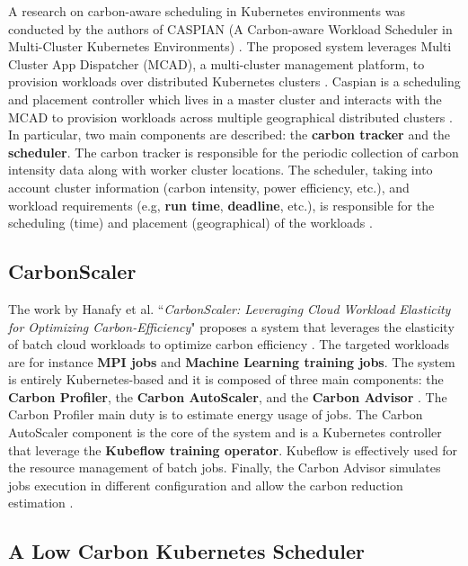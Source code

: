 A research on carbon-aware scheduling in Kubernetes environments was conducted by the authors of CASPIAN (A Carbon-aware Workload Scheduler in Multi-Cluster Kubernetes Environments) \cite{10786568}.
The proposed system leverages Multi Cluster App Dispatcher (MCAD), a multi-cluster management platform, to provision workloads over distributed Kubernetes clusters \cite{10786568}.
Caspian is a scheduling and placement controller which lives in a master cluster and interacts with the MCAD to provision workloads across multiple geographical distributed clusters \cite{10786568}.
In particular, two main components are described: the \textbf{carbon tracker} and the \textbf{scheduler}.
The carbon tracker is responsible for the periodic collection of carbon intensity data along with worker cluster locations.
The scheduler, taking into account cluster information (carbon intensity, power efficiency, etc.), and workload requirements (e.g, \textbf{run time}, \textbf{deadline}, etc.), is responsible for the scheduling (time) and placement (geographical) of the workloads \cite{10786568}.

\subsection{CarbonScaler}

The work by Hanafy et al. ``\textit{CarbonScaler: Leveraging Cloud Workload Elasticity for Optimizing Carbon-Efficiency}" proposes a system that leverages the elasticity of batch cloud workloads to optimize carbon efficiency \cite{10.1145/3626788}.
The targeted workloads are for instance \textbf{MPI jobs} and \textbf{Machine Learning training jobs}.
The system is entirely Kubernetes-based and it is composed of three main components: the \textbf{Carbon Profiler}, the \textbf{Carbon AutoScaler}, and the \textbf{Carbon Advisor} \cite{10.1145/3626788}.
The Carbon Profiler main duty is to estimate energy usage of jobs.
The Carbon AutoScaler component is the core of the system and is a Kubernetes controller that leverage the \textbf{Kubeflow training operator}.
Kubeflow is effectively used for the resource management of batch jobs.
Finally, the Carbon Advisor simulates jobs execution in different configuration and allow the carbon reduction estimation \cite{10.1145/3626788}.

\subsection{A Low Carbon Kubernetes Scheduler}
\label{sec:low_carbon_k8s_scheduler}

